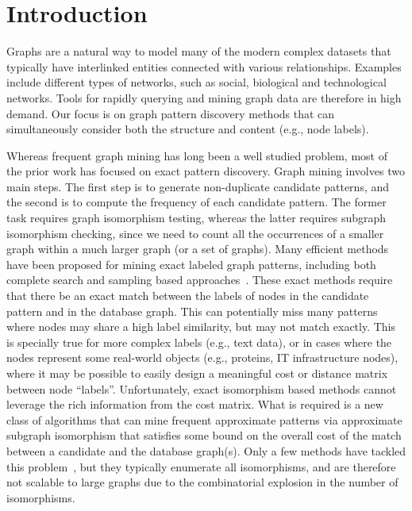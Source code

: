 \section{Introduction}

Graphs are a natural way to model many of the modern complex datasets
that typically have interlinked entities connected with various
relationships. Examples include different types of networks, such as
social, biological and technological networks. Tools for rapidly
querying and mining graph data are therefore in high demand. Our focus
is on graph pattern discovery methods that can simultaneously consider
both the structure and content (e.g., node labels).

Whereas frequent graph mining has long been a well studied problem, most
of the prior work has focused on exact pattern discovery.  Graph mining
involves two main steps. The first step is to generate non-duplicate
candidate patterns, and the second is to compute the frequency of each
candidate pattern. The former task requires graph isomorphism testing,
whereas the latter requires subgraph isomorphism checking, since we need
to count all the occurrences of a smaller graph within a much larger
graph (or a set of graphs). Many efficient methods have been proposed
for mining exact labeled graph patterns, including both complete search
and sampling based
approaches~\cite{gSpan,HWP03,kuramochi2005ffp,FSG01,IWM03,2009-graphsampling}.
These exact methods require that there be an exact match between the
labels of nodes in the candidate pattern and in the database graph. This
can potentially miss many patterns where nodes may share a high label
similarity, but may not match exactly. This is specially true for more
complex labels (e.g., text data), or in cases where the nodes represent
some real-world objects (e.g., proteins, IT infrastructure nodes), where
it may be possible to easily design a meaningful cost or distance matrix
between node ``labels''. Unfortunately, exact isomorphism based methods
cannot leverage the rich information from the cost matrix.  What is
required is a new class of algorithms that can mine frequent approximate
patterns via approximate subgraph isomorphism that satisfies some bound
on the overall cost of the match between a candidate and the database
graph(s). Only a few methods have tackled this
problem~\cite{gapprox,JiaZH11,RAM2008}, but they typically enumerate all
isomorphisms, and are therefore not scalable to large graphs due to the
combinatorial explosion in the number of isomorphisms.

